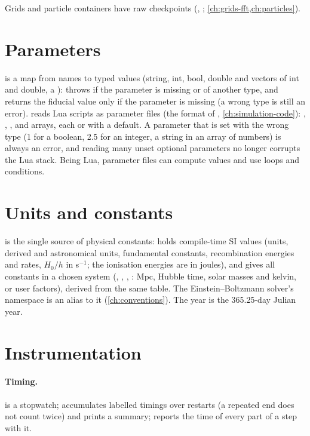 Grids and particle containers have raw checkpoints (, ; \cref{ch:grids-fft,ch:particles}).

\section{Parameters}\label{sec:io-parameters}

 is a map from names to typed values (string, int, bool, double and vectors of int and double, a
):  throws if the parameter is missing or of another type, and 
returns the fiducial value only if the parameter is missing (a wrong type is still an error).  reads Lua scripts as
parameter files (the format of , \cref{ch:simulation-code}): , ,
,  and arrays, each  or  with a default. A parameter that is set with the
wrong type (1 for a boolean, 2.5 for an integer, a string in an array of numbers) is always an error, and reading many unset optional
parameters no longer corrupts the Lua stack. Being Lua, parameter files can compute values and use loops and conditions.

\section{Units and constants}\label{sec:io-units}

 is the single source of physical constants:  holds compile-time SI values (units, derived and
astronomical units, fundamental constants, recombination energies and rates, $H_0/h$ in s$^{-1}$; the ionisation energies are in joules),
and  gives all constants in a chosen system (, , ,
: Mpc, Hubble time, solar masses and kelvin, or user factors), derived from the same table. The Einstein--Boltzmann
solver's  namespace is an alias to it (\cref{ch:conventions}). The year is the 365.25-day Julian year.

\section{Instrumentation}\label{sec:io-instrumentation}

\paragraph*{Timing.}  is a stopwatch;  accumulates labelled timings over restarts (a repeated end does not count
twice) and prints a summary;  reports the time of every part of a step with it.

